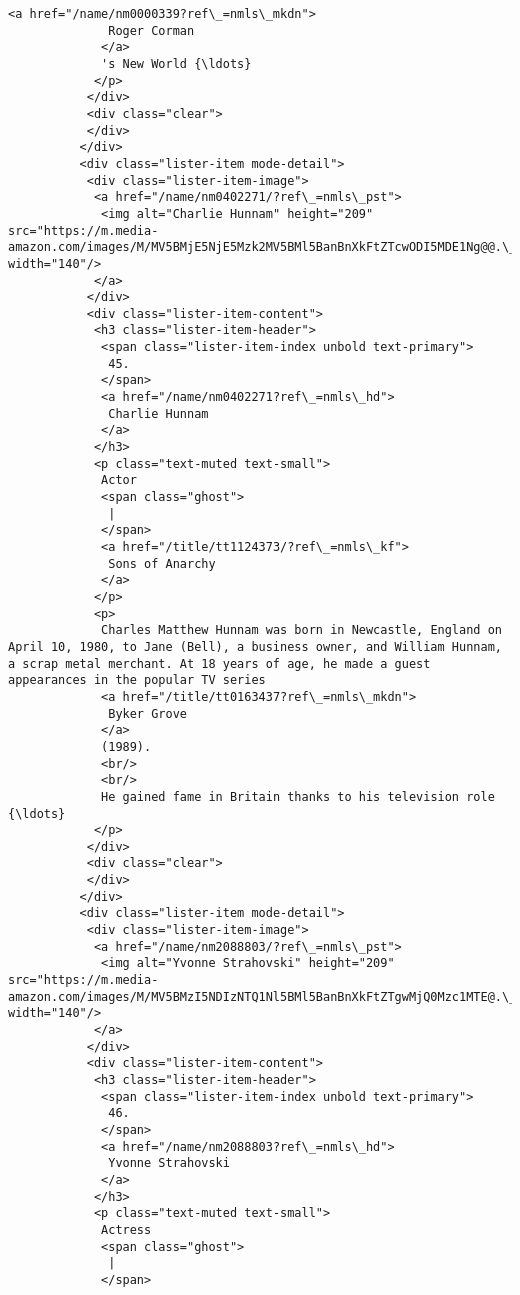 \documentclass[11pt]{article}
\begin{document}
\begin{Verbatim}[commandchars=\\\{\}]
             <a href="/name/nm0000339?ref\_=nmls\_mkdn">
              Roger Corman
             </a>
             's New World {\ldots}
            </p>
           </div>
           <div class="clear">
           </div>
          </div>
          <div class="lister-item mode-detail">
           <div class="lister-item-image">
            <a href="/name/nm0402271/?ref\_=nmls\_pst">
             <img alt="Charlie Hunnam" height="209" src="https://m.media-amazon.com/images/M/MV5BMjE5NjE5Mzk2MV5BMl5BanBnXkFtZTcwODI5MDE1Ng@@.\_V1\_UY209\_CR4,0,140,209\_AL\_.jpg" width="140"/>
            </a>
           </div>
           <div class="lister-item-content">
            <h3 class="lister-item-header">
             <span class="lister-item-index unbold text-primary">
              45.
             </span>
             <a href="/name/nm0402271?ref\_=nmls\_hd">
              Charlie Hunnam
             </a>
            </h3>
            <p class="text-muted text-small">
             Actor
             <span class="ghost">
              |
             </span>
             <a href="/title/tt1124373/?ref\_=nmls\_kf">
              Sons of Anarchy
             </a>
            </p>
            <p>
             Charles Matthew Hunnam was born in Newcastle, England on April 10, 1980, to Jane (Bell), a business owner, and William Hunnam, a scrap metal merchant. At 18 years of age, he made a guest appearances in the popular TV series
             <a href="/title/tt0163437?ref\_=nmls\_mkdn">
              Byker Grove
             </a>
             (1989).
             <br/>
             <br/>
             He gained fame in Britain thanks to his television role {\ldots}
            </p>
           </div>
           <div class="clear">
           </div>
          </div>
          <div class="lister-item mode-detail">
           <div class="lister-item-image">
            <a href="/name/nm2088803/?ref\_=nmls\_pst">
             <img alt="Yvonne Strahovski" height="209" src="https://m.media-amazon.com/images/M/MV5BMzI5NDIzNTQ1Nl5BMl5BanBnXkFtZTgwMjQ0Mzc1MTE@.\_V1\_UY209\_CR3,0,140,209\_AL\_.jpg" width="140"/>
            </a>
           </div>
           <div class="lister-item-content">
            <h3 class="lister-item-header">
             <span class="lister-item-index unbold text-primary">
              46.
             </span>
             <a href="/name/nm2088803?ref\_=nmls\_hd">
              Yvonne Strahovski
             </a>
            </h3>
            <p class="text-muted text-small">
             Actress
             <span class="ghost">
              |
             </span>

\end{Verbatim}
\end{document}
